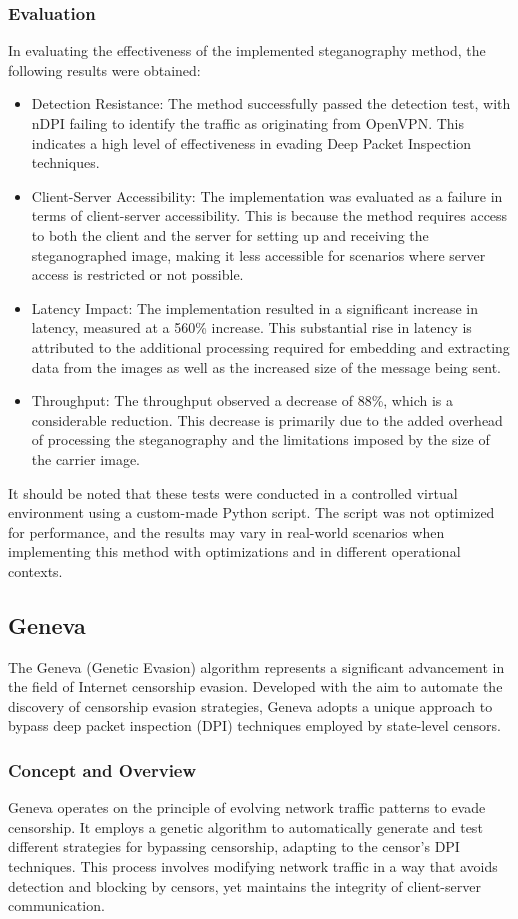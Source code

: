 \documentclass[12pt, fleqn, a4paper]{article}
\begin{document}
\subsubsection{Evaluation}
In evaluating the effectiveness of the implemented steganography method, the following results were obtained:
\begin{itemize}
\item Detection Resistance: The method successfully passed the detection test, with nDPI failing to identify the traffic as originating from OpenVPN. This indicates a high level of effectiveness in evading Deep Packet Inspection techniques.
\item Client-Server Accessibility: The implementation was evaluated as a failure in terms of client-server accessibility. This is because the method requires access to both the client and the server for setting up and receiving the steganographed image, making it less accessible for scenarios where server access is restricted or not possible.
\item Latency Impact: The implementation resulted in a significant increase in latency, measured at a 560\% increase. This substantial rise in latency is attributed to the additional processing required for embedding and extracting data from the images as well as the increased size of the message being sent.
\item Throughput: The throughput observed a decrease of 88\%, which is a considerable reduction. This decrease is primarily due to the added overhead of processing the steganography and the limitations imposed by the size of the carrier image.
\end{itemize}
It should be noted that these tests were conducted in a controlled virtual environment using a custom-made Python script. The script was not optimized for performance, and the results may vary in real-world scenarios when implementing this method with optimizations and in different operational contexts.

\subsection{Geneva}
The Geneva (Genetic Evasion) algorithm represents a significant advancement in the field of Internet censorship evasion. Developed with the aim to automate the discovery of censorship evasion strategies, Geneva adopts a unique approach to bypass deep packet inspection (DPI) techniques employed by state-level censors.
\subsubsection{Concept and Overview}
Geneva operates on the principle of evolving network traffic patterns to evade censorship. It employs a genetic algorithm to automatically generate and test different strategies for bypassing censorship, adapting to the censor's DPI techniques. This process involves modifying network traffic in a way that avoids detection and blocking by censors, yet maintains the integrity of client-server communication.
\end{document}
